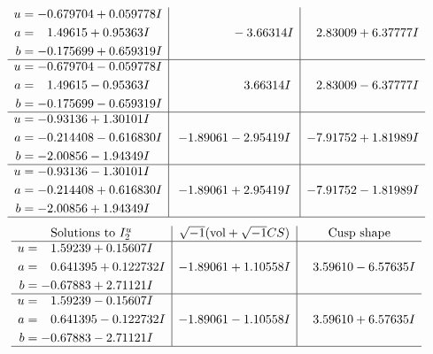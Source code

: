 \documentclass[1p]{elsarticle_modified}
\theoremstyle{definition}
\newcommand{\I}{\sqrt{-1}}
\begin{document}
$$\begin{array}{c|c|c}
\begin{aligned}
u &= -0.679704 + 0.059778 I \\
a &= \phantom{-}1.49615 + 0.95363 I \\
b &= -0.175699 + 0.659319 I\end{aligned}
 & \phantom{-0.000000 } -3.66314 I & \phantom{-}2.83009 + 6.37777 I \\ \hline\begin{aligned}
u &= -0.679704 - 0.059778 I \\
a &= \phantom{-}1.49615 - 0.95363 I \\
b &= -0.175699 - 0.659319 I\end{aligned}
 & \phantom{-0.000000 -}3.66314 I & \phantom{-}2.83009 - 6.37777 I \\ \hline\begin{aligned}
u &= -0.93136 + 1.30101 I \\
a &= -0.214408 - 0.616830 I \\
b &= -2.00856 - 1.94349 I\end{aligned}
 & -1.89061 - 2.95419 I & -7.91752 + 1.81989 I \\ \hline\begin{aligned}
u &= -0.93136 - 1.30101 I \\
a &= -0.214408 + 0.616830 I \\
b &= -2.00856 + 1.94349 I\end{aligned}
 & -1.89061 + 2.95419 I & -7.91752 - 1.81989 I\\
 \hline 
 \end{array}$$\newpage$$\begin{array}{c|c|c}  
\text{Solutions to }I^u_{2}& \I (\text{vol} + \sqrt{-1}CS) & \text{Cusp shape}\\
 \hline 
\begin{aligned}
u &= \phantom{-}1.59239 + 0.15607 I \\
a &= \phantom{-}0.641395 + 0.122732 I \\
b &= -0.67883 + 2.71121 I\end{aligned}
 & -1.89061 + 1.10558 I & \phantom{-}3.59610 - 6.57635 I \\ \hline\begin{aligned}
u &= \phantom{-}1.59239 - 0.15607 I \\
a &= \phantom{-}0.641395 - 0.122732 I \\
b &= -0.67883 - 2.71121 I\end{aligned}
 & -1.89061 - 1.10558 I & \phantom{-}3.59610 + 6.57635 I\\
 \hline 
 \end{array}$$\newpage\newpage\renewcommand{\arraystretch}{1}
\end{document}

